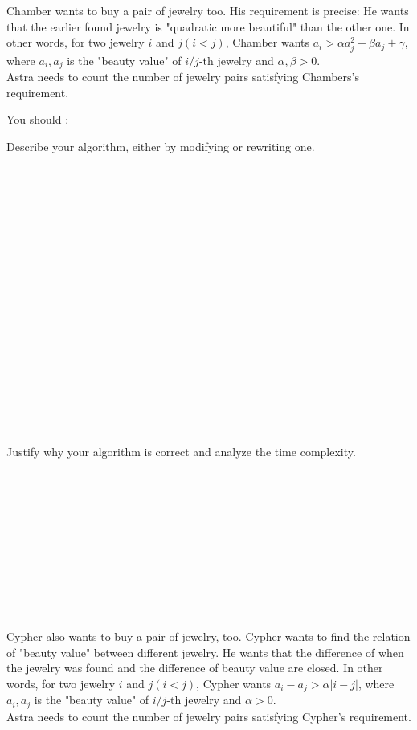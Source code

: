 \begin{parts}
\part{}

Chamber wants to buy a pair of jewelry too. His requirement is precise: He wants that the earlier found jewelry is "quadratic more beautiful" than the other one. In other words, for two jewelry $i$ and $j(i<j)$, Chamber wants $a_i>\alpha a_j^2+\beta a_j + \gamma$, where $a_i,a_j$ is the "beauty value" of $i/j$-th jewelry and $\alpha,\beta>0$.\\
Astra needs to count the number of jewelry pairs satisfying Chambers's requirement.

You should :
\begin{subparts}
  \subpart[4]Describe your algorithm, either by modifying or rewriting one.
    \begin{solution}
\\
\\
\\
\\
\\
\\
\\
\\
\\
\\
\\
\\
\\
\\
\\
\\
\\
    \end{solution}
    \subpart[2] Justify why your algorithm is correct and analyze the time complexity. 
    \begin{solution}
\\
\\
\\
\\
\\
\\
\\
\\
    \end{solution}
\end{subparts}

\newpage
\part{} Cypher also wants to buy a pair of jewelry, too. Cypher wants to find the relation of "beauty value" between different jewelry. He wants that the difference of when the jewelry was found and the difference of beauty value are closed. In other words, for two jewelry $i$ and $j(i<j)$, Cypher wants $a_i- a_j>\alpha|i-j|$, where $a_i,a_j$ is the "beauty value" of $i/j$-th jewelry and $\alpha>0$.\\
Astra needs to count the number of jewelry pairs satisfying Cypher's requirement.


\end{parts}
